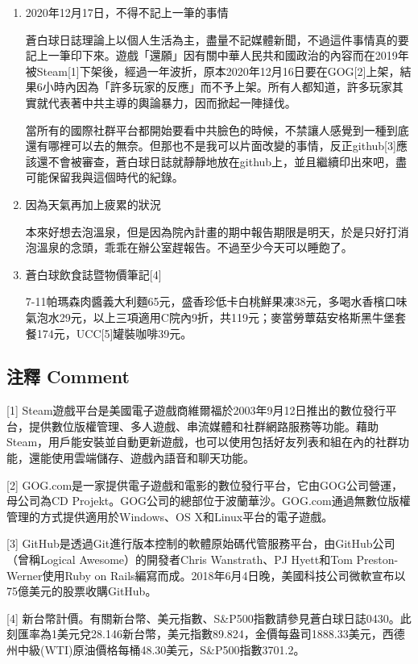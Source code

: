 \documentclass[
]{article}
\begin{document}
\begin{enumerate}
\def\labelenumi{\arabic{enumi}.}
\item
  2020年12月17日，不得不記上一筆的事情

  蒼白球日誌理論上以個人生活為主，盡量不記媒體新聞，不過這件事情真的要記上一筆印下來。遊戲「還願」因有關中華人民共和國政治的內容而在2019年被Steam{[}1{]}下架後，經過一年波折，原本2020年12月16日要在GOG{[}2{]}上架，結果6小時內因為「許多玩家的反應」而不予上架。所有人都知道，許多玩家其實就代表著中共主導的輿論暴力，因而掀起一陣撻伐。

  當所有的國際社群平台都開始要看中共臉色的時候，不禁讓人感覺到一種到底還有哪裡可以去的無奈。但那也不是我可以片面改變的事情，反正github{[}3{]}應該還不會被審查，蒼白球日誌就靜靜地放在github上，並且繼續印出來吧，盡可能保留我與這個時代的紀錄。
\item
  因為天氣再加上疲累的狀況

  本來好想去泡溫泉，但是因為院內計畫的期中報告期限是明天，於是只好打消泡溫泉的念頭，乖乖在辦公室趕報告。不過至少今天可以睡飽了。
\item
  蒼白球飲食誌暨物價筆記{[}4{]}

  7-11帕瑪森肉醬義大利麵65元，盛香珍低卡白桃鮮果凍38元，多喝水香檳口味氣泡水29元，以上三項適用C院內9折，共119元；麥當勞蕈菇安格斯黑牛堡套餐174元，UCC{[}5{]}罐裝咖啡39元。
\end{enumerate}

\hypertarget{ux6ce8ux91cb-comment-16}{%
\subsection{注釋 Comment}\label{ux6ce8ux91cb-comment-16}}

{[}1{]}
Steam遊戲平台是美國電子遊戲商維爾福於2003年9月12日推出的數位發行平台，提供數位版權管理、多人遊戲、串流媒體和社群網路服務等功能。藉助Steam，用戶能安裝並自動更新遊戲，也可以使用包括好友列表和組在內的社群功能，還能使用雲端儲存、遊戲內語音和聊天功能。

{[}2{]}
GOG.com是一家提供電子遊戲和電影的數位發行平台，它由GOG公司營運，母公司為CD
Projekt。GOG公司的總部位于波蘭華沙。GOG.com通過無數位版權管理的方式提供適用於Windows、OS
X和Linux平台的電子遊戲。

{[}3{]}
GitHub是透過Git進行版本控制的軟體原始碼代管服務平台，由GitHub公司（曾稱Logical
Awesome）的開發者Chris Wanstrath、PJ Hyett和Tom Preston-Werner使用Ruby
on
Rails編寫而成。2018年6月4日晚，美國科技公司微軟宣布以75億美元的股票收購GitHub。

{[}4{]}
新台幣計價。有關新台幣、美元指數、S\&P500指數請參見蒼白球日誌0430。此刻匯率為1美元兌28.146新台幣，美元指數89.824，金價每盎司1888.33美元，西德州中級(WTI)原油價格每桶48.30美元，S\&P500指數3701.2。
\end{document}
